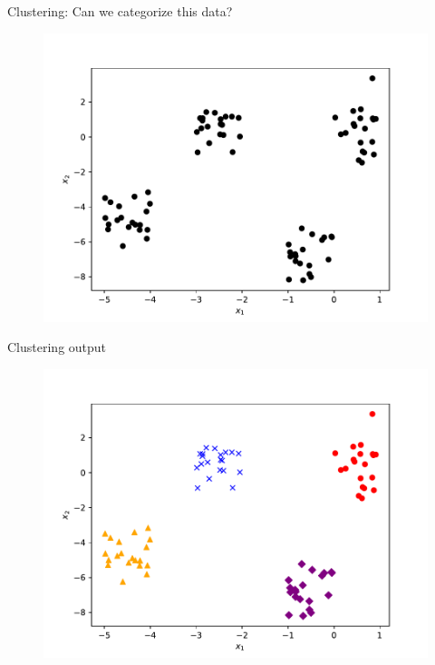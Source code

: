 \documentclass[10pt]{beamer}
\begin{document}
\begin{frame}{Clustering: Can we categorize this data?}
\begin{figure}
\includegraphics[width=1.0\textwidth]{figs/clust.pdf}
\end{figure}
\end{frame}

\begin{frame}{Clustering output}
\begin{figure}
\includegraphics[width=1.0\textwidth]{figs/cluster.pdf}
\end{figure}
\end{frame}
\end{document}
